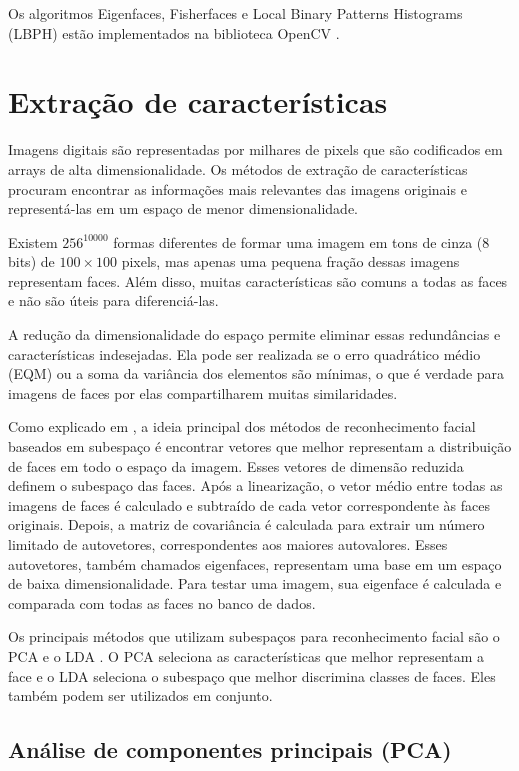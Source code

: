 Os algoritmos Eigenfaces, Fisherfaces e Local Binary Patterns Histograms (LBPH) estão implementados na biblioteca OpenCV \cite{opencvreconhecimento}.


\section{Extração de características}\label{sec:extract_caract}

Imagens digitais são representadas por milhares de pixels que são codificados em arrays de alta dimensionalidade. Os métodos de extração de características procuram encontrar as informações mais relevantes das imagens originais e representá-las em um espaço de menor dimensionalidade.

Existem $256^{10000}$ formas diferentes de formar uma imagem em tons de cinza (8 bits) de $100\times100$ pixels, mas apenas uma pequena fração dessas imagens representam faces. Além disso, muitas características são comuns a todas as faces e não são úteis para diferenciá-las.

A redução da dimensionalidade do espaço permite eliminar essas redundâncias e características indesejadas. Ela pode ser realizada se o erro quadrático médio (EQM) ou a soma da variância dos elementos são mínimas, o que é verdade para imagens de faces por elas compartilharem muitas similaridades.

Como explicado em \cite{datta2015face}, a ideia principal dos métodos de reconhecimento facial baseados em subespaço é encontrar vetores que melhor representam a distribuição de faces em todo o espaço da imagem. Esses vetores de dimensão reduzida definem o subespaço das faces. Após a linearização, o vetor médio entre todas as imagens de faces é calculado e subtraído de cada vetor correspondente às faces originais. Depois, a matriz de covariância é calculada para extrair um número limitado de autovetores, correspondentes aos maiores autovalores. Esses autovetores, também chamados eigenfaces, representam uma base em um espaço de baixa dimensionalidade. Para testar uma imagem, sua eigenface é calculada e comparada com todas as faces no banco de dados.

Os principais métodos que utilizam subespaços para reconhecimento facial são o PCA e o LDA \cite{wang2004unified}. O PCA seleciona as características que melhor representam a face e o LDA seleciona o subespaço que melhor discrimina classes de faces. Eles também podem ser utilizados em conjunto.


\subsection{Análise de componentes principais (PCA)}\label{sec:pca}

